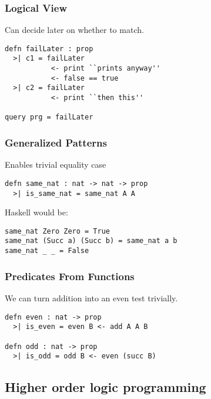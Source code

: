 
\begin{frame}[fragile]
\frametitle{Logical View}

Can decide later on whether to match.

\begin{lstlisting}
defn failLater : prop 
  >| c1 = failLater 
           <- print ``prints anyway'' 
           <- false == true
  >| c2 = failLater
           <- print ``then this''

query prg = failLater
\end{lstlisting}
\end{frame}


\begin{frame}[fragile]
\frametitle{Generalized Patterns}

Enables trivial equality case

\begin{lstlisting}
defn same_nat : nat -> nat -> prop
  >| is_same_nat = same_nat A A
\end{lstlisting}

Haskell would be: 

\begin{lstlisting}
same_nat Zero Zero = True
same_nat (Succ a) (Succ b) = same_nat a b
same_nat _ _ = False
\end{lstlisting}
\end{frame}


\begin{frame}[fragile]
\frametitle{Predicates From Functions}

We can turn addition into an even test trivially.

\begin{lstlisting}
defn even : nat -> prop
  >| is_even = even B <- add A A B

defn odd : nat -> prop
  >| is_odd = odd B <- even (succ B)
\end{lstlisting}
\end{frame}

\subsection[HOLP]{Higher order logic programming}

